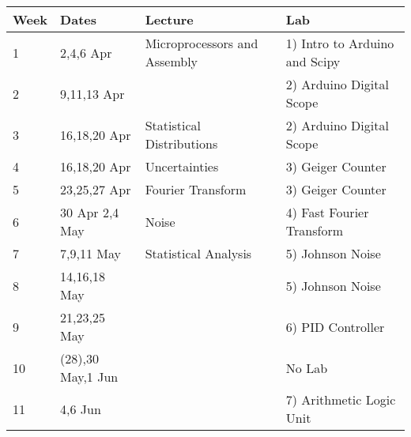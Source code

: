 \documentclass[12pt]{article}
\begin{document}
\begin{table}[h!]
\normalsize %
\begin{tabular}{ llll }
\hline
\textbf{Week} & \textbf{Dates} & \textbf{Lecture} & \textbf{Lab} \\
\hline
1 & 2,4,6 Apr & Microprocessors and Assembly & 1) Intro to Arduino and Scipy \\
\hline
2 & 9,11,13 Apr &  & 2) Arduino Digital Scope \\
\hline
3 & 16,18,20 Apr & Statistical Distributions & 2) Arduino Digital Scope  \\
\hline
4 & 16,18,20 Apr & Uncertainties & 3) Geiger Counter \\
\hline
5 & 23,25,27 Apr & Fourier Transform& 3) Geiger Counter \\
\hline
6 & 30 Apr 2,4 May & Noise & 4) Fast Fourier Transform \\
\hline
7 & 7,9,11 May & Statistical Analysis & 5) Johnson Noise \\
\hline
8 & 14,16,18 May &  & 5) Johnson Noise \\
\hline
9 & 21,23,25 May & & 6) PID Controller\\
\hline
10 & (28),30 May,1 Jun & &  No Lab \\
\hline
11 &  4,6 Jun &  & 7)  Arithmetic Logic Unit\\
\hline
\end{tabular} 
\end{table}
\end{document}
